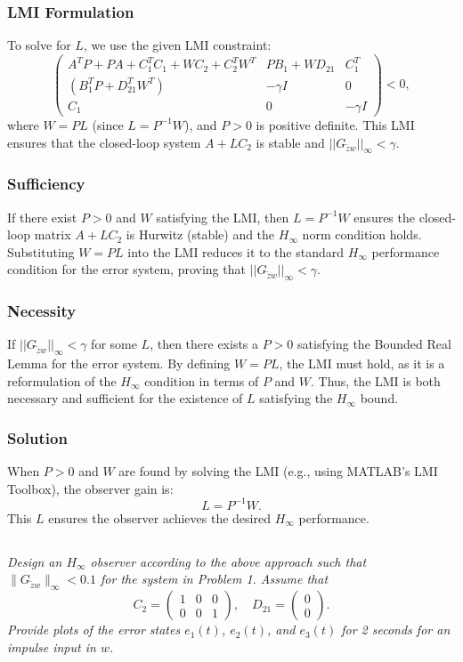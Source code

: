\documentclass[12pt, letterpaper]{article}
\begin{document}
\subsubsection*{LMI Formulation}
To solve for \( L \), we use the given LMI constraint:
\[
\begin{pmatrix}
A^T P + PA + C_1^T C_1 + WC_2 + C_2^T W^T & PB_1 + WD_{21} & C_1^T \\
(B_1^T P + D_{21}^T W^T) & -\gamma I & 0 \\
C_1 & 0 & -\gamma I
\end{pmatrix} < 0,
\]
where \( W = PL \) (since \( L = P^{-1}W \)), and \( P > 0 \) is positive definite. This LMI ensures that the closed-loop system \( A + LC_2 \) is stable and \( ||G_{\tilde{z}w}||_\infty < \gamma \).

\subsubsection*{Sufficiency}
If there exist \( P > 0 \) and \( W \) satisfying the LMI, then \( L = P^{-1}W \) ensures the closed-loop matrix \( A + LC_2 \) is Hurwitz (stable) and the \( H_\infty \) norm condition holds. Substituting \( W = PL \) into the LMI reduces it to the standard \( H_\infty \) performance condition for the error system, proving that \( ||G_{\tilde{z}w}||_\infty < \gamma \).

\subsubsection*{Necessity}
If \( ||G_{\tilde{z}w}||_\infty < \gamma \) for some \( L \), then there exists a \( P > 0 \) satisfying the Bounded Real Lemma for the error system. By defining \( W = PL \), the LMI must hold, as it is a reformulation of the \( H_\infty \) condition in terms of \( P \) and \( W \). Thus, the LMI is both necessary and sufficient for the existence of \( L \) satisfying the \( H_\infty \) bound.

\subsubsection*{Solution}
When \( P > 0 \) and \( W \) are found by solving the LMI (e.g., using MATLAB’s LMI Toolbox), the observer gain is:
\[
L = P^{-1}W.
\]
This \( L \) ensures the observer achieves the desired \( H_\infty \) performance.


\subsection{}
\textit{
Design an $H_\infty$ observer according to the above approach such that $\|G_{\tilde{z}w}\|_\infty < 0.1$ for the system in Problem 1. Assume that
\[
C_2 = \begin{pmatrix} 1 & 0 & 0 \\ 0 & 0 & 1 \end{pmatrix}, \quad D_{21} = \begin{pmatrix} 0 \\ 0 \end{pmatrix}.
\]
Provide plots of the error states $e_1(t)$, $e_2(t)$, and $e_3(t)$ for 2 seconds for an impulse input in $w$.
}
\end{document}
